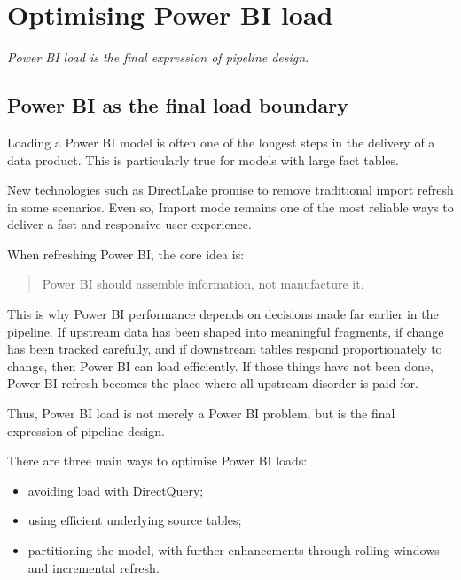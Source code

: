 \documentclass[10pt,openany,10pt]{book}
\providecommand{\tightlist}{%
  \setlength{\itemsep}{0pt}\setlength{\parskip}{0pt}}
\begin{document}
\newpage

\chapter{Optimising Power BI
load}\label{docs-efficient-stable-pipeline-optimising-power-bi-load}

\emph{Power BI load is the final expression of pipeline design.}

\section{Power BI as the final load
boundary}\label{power-bi-as-the-final-load-boundary}

Loading a Power BI model is often one of the longest steps in the
delivery of a data product. This is particularly true for models with
large fact tables.

New technologies such as DirectLake promise to remove traditional import
refresh in some scenarios. Even so, Import mode remains one of the most
reliable ways to deliver a fast and responsive user experience.

When refreshing Power BI, the core idea is:

\begin{quote}
Power BI should assemble information, not manufacture it.
\end{quote}

This is why Power BI performance depends on decisions made far earlier
in the pipeline. If upstream data has been shaped into meaningful
fragments, if change has been tracked carefully, and if downstream
tables respond proportionately to change, then Power BI can load
efficiently. If those things have not been done, Power BI refresh
becomes the place where all upstream disorder is paid for.

Thus, Power BI load is not merely a Power BI problem, but is the final
expression of pipeline design.

There are three main ways to optimise Power BI loads:

\begin{itemize}
\tightlist
\item
  avoiding load with DirectQuery;
\item
  using efficient underlying source tables;
\item
  partitioning the model, with further enhancements through rolling
  windows and incremental refresh.
\end{itemize}
\end{document}

